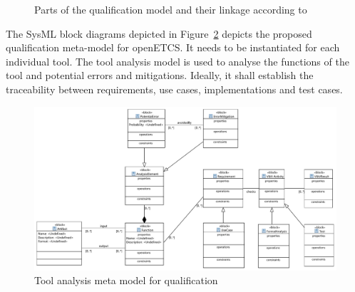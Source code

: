 \begin{figure}[htbp]
\begin{center}
\end{center}
\caption{Parts of the qualification model and their linkage according to \cite{slotosch_model-based_2012}}
\label{fig:qualification-models-linkage}
\end{figure}

The SysML block diagrams depicted in Figure~\ref{fig:tool_analysis_model} depicts the proposed qualification meta-model for openETCS. It needs to be instantiated for each individual tool. The tool analysis model is used to analyse the functions of the tool and potential errors and mitigations. Ideally, it shall establish the traceability between requirements, use cases, implementations and test cases.


\begin{figure}
\includegraphics[width=\textwidth]{ToolAnalysisModel.pdf}
\caption{Tool analysis meta model for qualification}
\label{fig:tool_analysis_model}
\end{figure}


